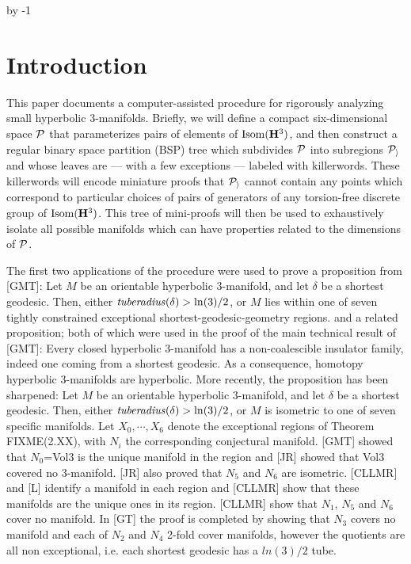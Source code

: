 \def\Arccosh{{\rm Arccosh}}
\advance\sectioncount by -1
\section{Introduction}

This paper documents a computer-assisted procedure
for rigorously analyzing small hyperbolic $3$-manifolds.
Briefly, we will define a compact six-dimensional space ${\cal P}$
that parameterizes pairs of elements of ${\rm Isom}({\bf H}^3)$,
and then construct a regular binary space partition (BSP) tree
which subdivides ${\cal P}$ into subregions ${\cal P_i}$
and whose leaves are --- with a few exceptions --- labeled with killerwords.
These killerwords will encode miniature proofs that ${\cal P_i}$
cannot contain any points which correspond to
particular choices of pairs of generators of
any torsion-free discrete group of ${\rm Isom}({\bf H}^3)$.
This tree of mini-proofs will then be used
to exhaustively isolate all possible manifolds
which can have properties related to the dimensions of ${\cal P}$.

The first two applications of the procedure
were used to prove a proposition from [GMT]:
Let $M$ be an orientable hyperbolic $3$-manifold, and let $\delta$ be
a shortest geodesic. Then, either ${\it tuberadius}(\delta) > \ln(3)/2$,
or $M$ lies within one of seven tightly constrained
exceptional shortest-geodesic-geometry regions.
\endproclaim
and a related proposition; both of which were used in the proof of
the main technical result of [GMT]:
Every closed hyperbolic $3$-manifold
has a non-coalescible insulator family,
indeed one coming from a shortest geodesic.
As a consequence,
homotopy hyperbolic $3$-manifolds are hyperbolic.
\endproclaim
More recently, the proposition has been sharpened:
Let $M$ be an orientable hyperbolic $3$-manifold,
and let $\delta$ be a shortest geodesic.
Then, either ${\it tuberadius}(\delta) > \ln(3)/2$, or
$M$ is isometric to one of seven specific manifolds.
\endproclaim
{}
Let $X_0, \cdots, X_6$ denote the exceptional regions of Theorem FIXME(2.XX),
with $N_i$ the corresponding conjectural manifold.
[GMT] showed that $N_0$=Vol3 is the unique manifold in the region
and [JR] showed that Vol3 covered no 3-manifold.
[JR] also proved that $N_5$ and $N_6$ are isometric.
[CLLMR] and [L] identify a manifold in each region
and [CLLMR] show that these manifolds are the unique ones in its region.
[CLLMR] show that $N_1$, $N_5$ and $N_6$ cover no manifold.
In [GT] the proof is completed by showing that $N_3$ covers no manifold
and each of $N_2$ and $N_4$ 2-fold cover manifolds,
however the quotients are all non exceptional,
i.e. each shortest geodesic has a $ln(3)/2$ tube.
\enddemo

